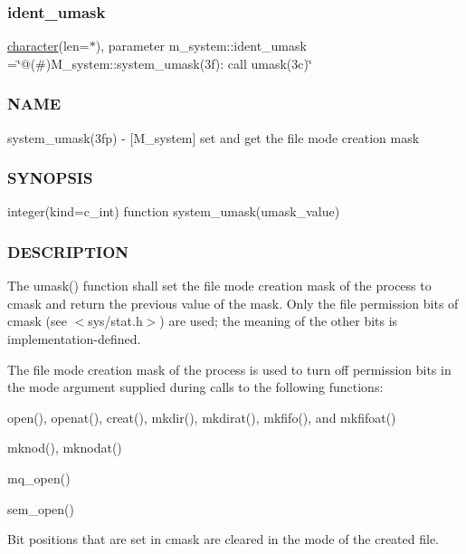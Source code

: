 \subsubsection{\texorpdfstring{ident\+\_\+umask}{ident\_umask}}
{\footnotesize\ttfamily \hyperlink{option__stopwatch_83_8txt_abd4b21fbbd175834027b5224bfe97e66}{character}(len=$\ast$), parameter m\+\_\+system\+::ident\+\_\+umask =\char`\"{}@(\#)M\+\_\+system\+::system\+\_\+umask(3f)\+: call umask(3c)\char`\"{}\hspace{0.3cm}{\ttfamily [private]}}



\subsubsection*{N\+A\+ME}

system\+\_\+umask(3fp) -\/ \mbox{[}M\+\_\+system\mbox{]} set and get the file mode creation mask \subsubsection*{S\+Y\+N\+O\+P\+S\+IS}

integer(kind=c\+\_\+int) function system\+\_\+umask(umask\+\_\+value)

\subsubsection*{D\+E\+S\+C\+R\+I\+P\+T\+I\+ON}

The umask() function shall set the file mode creation mask of the process to cmask and return the previous value of the mask. Only the file permission bits of cmask (see $<$sys/stat.\+h$>$) are used; the meaning of the other bits is implementation-\/defined.

The file mode creation mask of the process is used to turn off permission bits in the mode argument supplied during calls to the following functions\+:


\begin{DoxyItemize}
\item open(), openat(), creat(), mkdir(), mkdirat(), mkfifo(), and mkfifoat()
\item mknod(), mknodat()
\item mq\+\_\+open()
\item sem\+\_\+open()
\end{DoxyItemize}

Bit positions that are set in cmask are cleared in the mode of the created file.

